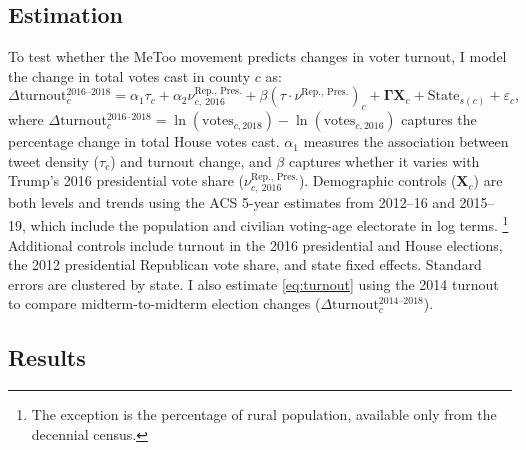 \documentclass[manuscript,screen,nonacm,11pt,acm]{acmart}
\begin{document}
\subsection{Estimation}
\label{sec:turnout-estimation}
To test whether the MeToo movement predicts changes in voter turnout, I model the change in total votes cast in county $c$ as:
\begin{equation}
\label{eq:turnout}
\Delta\text{turnout}_c^{2016\text{--}2018} = 
\alpha_1 \tau_c + 
\alpha_2 \nu^{\text{Rep., Pres.}}_{c,\ 2016} + 
\beta (\tau \cdot \nu^{\text{Rep., Pres.}})_c + 
\bm{\Gamma} \bm{X}_c + 
\text{State}_{s(c)} +
\varepsilon_c,
\end{equation}
where $\Delta\text{turnout}_c^{2016\text{--}2018} = \ln(\text{votes}_{c,2018}) - \ln(\text{votes}_{c,2016})$ captures the percentage change in total House votes cast.
$\alpha_1$ measures the association between tweet density ($\tau_c$) and turnout change, and $\beta$ captures whether it varies with Trump's 2016 presidential vote share ($\nu^{\text{Rep., Pres.}}_{c,\ 2016}$).
Demographic controls ($\bm{X}_c$) are both levels and trends using the ACS 5-year estimates from 2012--16 and 2015--19, which include the population and civilian voting-age electorate in log terms.%
\footnote{The exception is the percentage of rural population, available only from the decennial census.}
Additional controls include turnout in the 2016 presidential and House elections, the 2012 presidential Republican vote share, and state fixed effects.
Standard errors are clustered by state.
I also estimate \cref{eq:turnout} using the 2014 turnout to compare midterm-to-midterm election changes ($\Delta\text{turnout}_c^{2014\text{--}2018}$).

\subsection{Results}
\label{sec:turnout-results}
\end{document}
